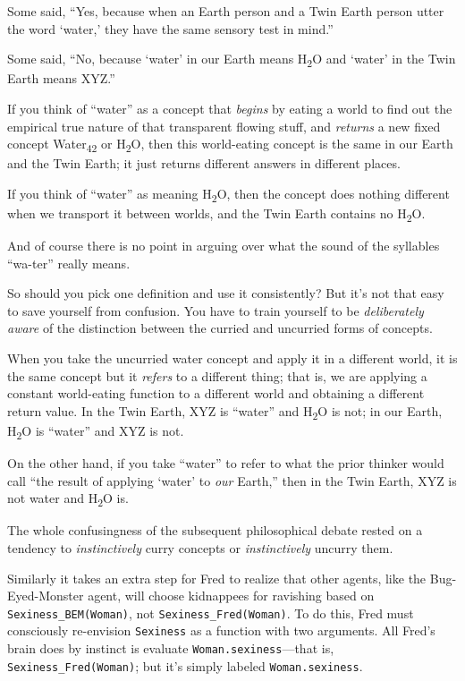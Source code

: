 {
 Some said, ``Yes, because when an Earth person
and a Twin Earth person utter the word
`water,' they have the same sensory test
in mind.''}

{
 Some said, ``No, because
`water' in our Earth means
H\textsubscript{2}O and `water' in the
Twin Earth means XYZ.''}

{
 If you think of ``water'' as a
concept that \textit{begins} by eating a world to find out the
empirical true nature of that transparent flowing stuff, and
\textit{returns} a new fixed concept Water\textsubscript{42} or
H\textsubscript{2}O, then this world-eating concept is the same in our
Earth and the Twin Earth; it just returns different answers in
different places.}

{
 If you think of ``water'' as
meaning H\textsubscript{2}O, then the concept does nothing different
when we transport it between worlds, and the Twin Earth contains no
H\textsubscript{2}O.}

{
 And of course there is no point in arguing over what the sound of
the syllables ``wa-ter'' really
means.}

{
 So should you pick one definition and use it consistently? But
it's not that easy to save yourself from confusion. You
have to train yourself to be \textit{deliberately aware} of the
distinction between the curried and uncurried forms of concepts.}

{
 When you take the uncurried water concept and apply it in a
different world, it is the same concept but it \textit{refers} to a
different thing; that is, we are applying a constant world-eating
function to a different world and obtaining a different return value.
In the Twin Earth, XYZ is ``water''
and H\textsubscript{2}O is not; in our Earth, H\textsubscript{2}O is
``water'' and XYZ is not.}

{
 On the other hand, if you take
``water'' to refer to what the prior
thinker would call ``the result of applying
`water' to \textit{our}
Earth,'' then in the Twin Earth, XYZ is not water and
H\textsubscript{2}O is.}

{
 The whole confusingness of the subsequent philosophical debate
rested on a tendency to \textit{instinctively} curry concepts or
\textit{instinctively} uncurry them.}

{
 Similarly it takes an extra step for Fred to realize that other
agents, like the Bug-Eyed-Monster agent, will choose kidnappees for
ravishing based on \texttt{Sexiness\_BEM(Woman)}, not \texttt{Sexiness\_Fred(Woman)}. To
do this, Fred must consciously re-envision \texttt{Sexiness} as a function with
two arguments. All Fred's brain does by instinct is
evaluate \texttt{Woman.sexiness}---that is, \texttt{Sexiness\_Fred(Woman)}; but
it's simply labeled \texttt{Woman.sexiness}.}

